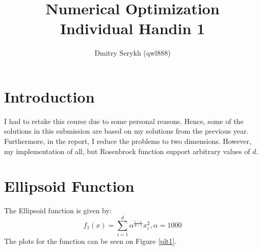\documentclass[a4paper]{article}
\title{\vspace{-5cm} Numerical Optimization \\ Individual Handin 1}
\author{Dmitry Serykh (qwl888)}
\begin{document}
\maketitle
\section{Introduction}
\label{intro}
I had to retake this course due to some personal reasons.
Hence, some of the solutions in this submission are based on my solutions from
the previous year. Furthermore, in the report, I reduce the problems to two
dimensions. However, my implementation of all, but Rosenbrock function support
arbitrary values of $d$.

\section{Ellipsoid Function}
\label{sec:ellipse}
The Ellipsoid function is given by:
\[
f_{1}(x)=\sum_{i=1}^{d} \alpha^{\frac{i-1}{d-1}} x_{i}^{2}, \alpha=1000
\]
The plots for the function can be seen on Figure \ref{plt1}.
\end{document}
